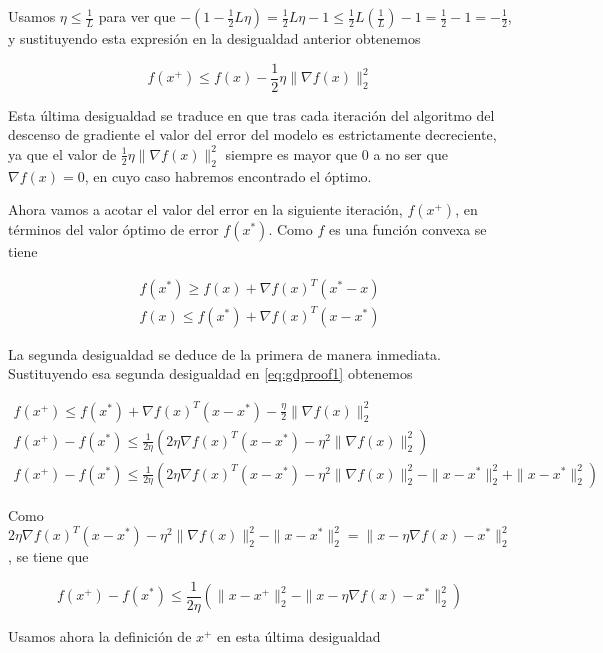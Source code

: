 Usamos $\eta \leq \frac{1}{L}$ para ver que $-(1-\frac{1}{2}L \eta)= \frac{1}{2} L \eta - 1 \leq \frac{1}{2} L (\frac{1}{L}) - 1 = \frac{1}{2} - 1 = -\frac{1}{2}$, y sustituyendo esta expresión en la desigualdad anterior obtenemos 

\begin{equation}\label{eq:gdproof1}
	f(x^+) \leq f(x) - \frac{1}{2} \eta \| \nabla f(x) \|^2_2 
\end{equation}

Esta última desigualdad se traduce en que tras cada iteración del algoritmo del descenso de gradiente el valor del error del modelo es estrictamente decreciente, ya que el valor de $\frac{1}{2} \eta \| \nabla f(x) \|^2_2$ siempre es mayor que 0 a no ser que $\nabla f(x)=0$, en cuyo caso habremos encontrado el óptimo. 

Ahora vamos a acotar el valor del error en la siguiente iteración, $f(x^+)$, en términos del valor óptimo de error $f(x^*)$. Como $f$ es una función convexa se tiene

\begin{align*}
    f(x^*) \geq f(x) + \nabla f(x) ^T (x^* - x) \\
    f(x) \leq f(x^*) + \nabla f(x)^T (x-x^*)
\end{align*}

La segunda desigualdad se deduce de la primera de manera inmediata. Sustituyendo esa segunda desigualdad en \ref{eq:gdproof1} obtenemos

\begin{gather*}
    f(x^+) \leq f(x^*) + \nabla f(x)^T (x-x^*) - \frac{\eta}{2} \| \nabla f(x) \| ^2_2 \\ 
    f(x^+) - f(x^*) \leq  \frac{1}{2\eta}  \left ( 2 \eta \nabla f(x)^T (x-x^*) - \eta ^2 \| \nabla f(x) \| ^2_2 \right ) \\ 
    f(x^+) - f(x^*) \leq  \frac{1}{2\eta}  \left ( 2 \eta \nabla f(x)^T (x-x^*) - \eta ^2 \| \nabla f(x) \| ^2_2 - \| x - x^* \|^2_2 + \| x - x^* \|^2_2 \right )    
\end{gather*}

Como $  2 \eta \nabla f(x)^T (x-x^*) - \eta ^2 \| \nabla f(x) \| ^2_2 - \| x - x^* \|^2_2 = \| x - \eta \nabla f(x) - x^* \|^2_2 $, se tiene que

$$ f(x^+) - f(x^*) \leq  \frac{1}{2\eta}  \left ( \| x - x^+ \|^2_2 -  \| x - \eta \nabla f(x) - x^* \|^2_2 \right ) $$

Usamos ahora la definición de $x^+$ en esta última desigualdad


